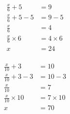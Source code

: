 \documentclass[12pt]{article}
\newcounter{minipagecount}
\begin{document}
\begin{multicols}{2}
\begin{minipage}[t]{0.45\textwidth}
    \begin{align*} %
        \frac{x}{6} + 5 &= 9\\
        \frac{x}{6} + 5 - 5 &= 9 - 5\\
        \frac{x}{6} &= 4\\
        \frac{x}{6} \times6 &= 4 \times6\\
        x &= 24\\
    \end{align*}
\end{minipage} %
\noindent{(\theminipagecount)}\hspace{0.1mm} %
\begin{minipage}[t]{0.45\textwidth} %
    \vspace{-26pt}  %
    \raggedright %
    \begin{align*} %
        \frac{x}{10} + 3 &= 10\\
        \frac{x}{10} + 3 - 3 &= 10 - 3\\
        \frac{x}{10} &= 7\\
        \frac{x}{10} \times10 &= 7 \times10\\
        x &= 70\\
    \end{align*}
\end{minipage} %
\noindent{(\theminipagecount)}\hspace{0.1mm} %
\begin{minipage}[t]{0.45\textwidth} %
    \vspace{-26pt}  %

\end{minipage}
\end{multicols}
\end{document}
